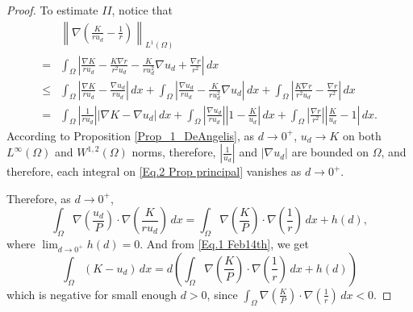 \documentclass[11pt]{article}
\newcommand{\norm}[1]{\left\|#1\right\|}
\newcommand{\parentheses}[1]{\left(#1\right)}
\newcommand{\module}[1]{\left|#1\right|}
\theoremstyle{definition}
\theoremstyle{remark}
\begin{document}
\begin{proof}
    To estimate $II$, notice that
	\begin{align}
		\nonumber&\norm{\nabla\parentheses{\frac{K}{r u_d}-\frac{1}{r}}}_{L^1(\Omega)}\\
		\nonumber=&\int_\Omega\module{\frac{\nabla K}{ru_d}-\frac{K\nabla r}{r^2u_d}-\frac{K}{ru_d^2}\nabla u_d+\frac{\nabla r}{r^2}}\,dx\\
		\nonumber\leq&\int_\Omega\module{\frac{\nabla K}{ru_d}-\frac{\nabla u_d}{ru_d}}\,dx+\int_\Omega\module{\frac{\nabla u_d}{ru_d}-\frac{K}{ru_d^2}\nabla u_d}\,dx+\int_\Omega \module{\frac{K\nabla r}{r^2 u_d}-\frac{\nabla r}{r^2}}\,dx\\
		=&\int_\Omega\module{\frac{1}{ru_d}}\module{\nabla K-\nabla u_d}\,dx+\int_\Omega\module{\frac{\nabla u_d}{ru_d}}\module{1-\frac{K}{u_d}}\,dx+\int_\Omega\module{\frac{\nabla r}{r^2}} \module{\frac{K}{u_d}-1}\,dx.\label{Eq.2 Prop principal}
	\end{align}	
According to Proposition \ref{Prop_1_DeAngelis}, as $d\to0^+$, $u_d\to K$ on both $L^\infty(\Omega)$ and $W^{1,2}(\Omega)$ norms, therefore,  $|\frac{1}{u_d}|$ and $|\nabla u_d|$ are bounded on $\Omega$,      and therefore, each integral on \eqref{Eq.2 Prop principal} vanishes as $d\to0^+$.
    

    Therefore, as $d\to0^+$,
    \begin{equation*}
        \int_\Omega\nabla\parentheses{\frac{u_d}{P}}\cdot\nabla\parentheses{\frac{K}{ru_d}}\,dx=\int_\Omega\nabla\parentheses{\frac{K}{P}}\cdot\nabla\parentheses{\frac{1}{r}}\,dx+h(d),
    \end{equation*}
    where $\lim_{d\to0^+}h(d)=0$. And from \eqref{Eq.1 Feb14th}, we get
    \begin{equation*}
        \int_\Omega(K-u_d)\,dx=d\parentheses{\int_\Omega\nabla\parentheses{\frac{K}{P}}\cdot\nabla\parentheses{\frac{1}{r}}\,dx+h(d)}
    \end{equation*}
    which is negative for small enough $d>0$, since $\int_\Omega\nabla\parentheses{\frac{K}{P}}\cdot\nabla\parentheses{\frac{1}{r}}\,dx<0$.
    


\end{proof}
\end{document}
